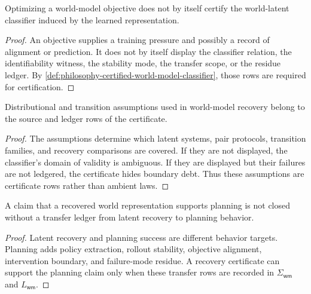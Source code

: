 \begin{theorem}
\label{thm:philosophy-world-model-objective-not-certifier}
Optimizing a world-model objective does not by itself certify the
world-latent classifier induced by the learned representation.
\end{theorem}
\begin{proof}
An objective supplies a training pressure and possibly a record of
alignment or prediction. It does not by itself display the classifier
relation, the identifiability witness, the stability mode, the transfer
scope, or the residue ledger. By
\autoref{def:philosophy-certified-world-model-classifier}, those rows
are required for certification.
\end{proof}

\begin{theorem}
\label{thm:philosophy-world-model-assumptions-source-rows}
Distributional and transition assumptions used in world-model recovery
belong to the source and ledger rows of the certificate.
\end{theorem}
\begin{proof}
The assumptions determine which latent systems, pair protocols,
transition families, and recovery comparisons are covered. If they are
not displayed, the classifier's domain of validity is ambiguous. If they
are displayed but their failures are not ledgered, the certificate hides
boundary debt. Thus these assumptions are certificate rows rather than
ambient laws.
\end{proof}

\begin{theorem}
\label{thm:philosophy-world-model-planning-transfer-ledger}
A claim that a recovered world representation supports planning is not
closed without a transfer ledger from latent recovery to planning
behavior.
\end{theorem}
\begin{proof}
Latent recovery and planning success are different behavior targets.
Planning adds policy extraction, rollout stability, objective alignment,
intervention boundary, and failure-mode residue. A recovery certificate
can support the planning claim only when these transfer rows are recorded
in $\Sigma_{\mathsf{wm}}$ and $L_{\mathsf{wm}}$.
\end{proof}

